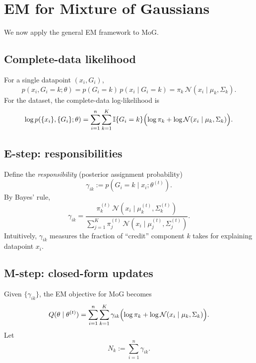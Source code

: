 \documentclass[../main]{subfiles}
\begin{document}
\section{EM for Mixture of Gaussians}
We now apply the general EM framework to MoG.

\subsection{Complete-data likelihood}
For a single datapoint $(x_i,G_i)$,
\begin{equation}
    p(x_i,G_i=k;\theta)
    =
    p(G_i=k)\,p(x_i\mid G_i=k)
    =
    \pi_k\,\mathcal N(x_i\mid \mu_k,\Sigma_k).
\end{equation}
For the dataset, the complete-data log-likelihood is
\begin{equation}
    \log p(\{x_i\},\{G_i\};\theta)
    =
    \sum_{i=1}^n \sum_{k=1}^K \mathbb I\{G_i=k\}
    \Bigl(
        \log \pi_k + \log \mathcal N(x_i\mid \mu_k,\Sigma_k)
    \Bigr).
\end{equation}

\subsection{E-step: responsibilities}
Define the \emph{responsibility} (posterior assignment probability)
\begin{equation}\label{eq:responsibility}
    \gamma_{ik}
    :=
    p(G_i=k \mid x_i;\theta^{(t)}).
\end{equation}
By Bayes' rule,
\begin{equation}\label{eq:mog-e-step}
    \gamma_{ik}
    =
    \frac{
        \pi_k^{(t)}\,\mathcal N(x_i\mid \mu_k^{(t)},\Sigma_k^{(t)})
    }{
        \sum_{j=1}^K \pi_j^{(t)}\,\mathcal N(x_i\mid \mu_j^{(t)},\Sigma_j^{(t)})
    }.
\end{equation}
Intuitively, $\gamma_{ik}$ measures the fraction of ``credit'' component $k$
takes for explaining datapoint $x_i$.

\subsection{M-step: closed-form updates}
Given $\{\gamma_{ik}\}$, the EM objective for MoG becomes
\begin{equation}\label{eq:mog-Q}
    Q(\theta\mid \theta^{(t)})
    =
    \sum_{i=1}^n \sum_{k=1}^K \gamma_{ik}
    \Bigl(
        \log \pi_k + \log \mathcal N(x_i\mid \mu_k,\Sigma_k)
    \Bigr).
\end{equation}
Let
\begin{equation}
    N_k := \sum_{i=1}^n \gamma_{ik}.
\end{equation}
\end{document}

